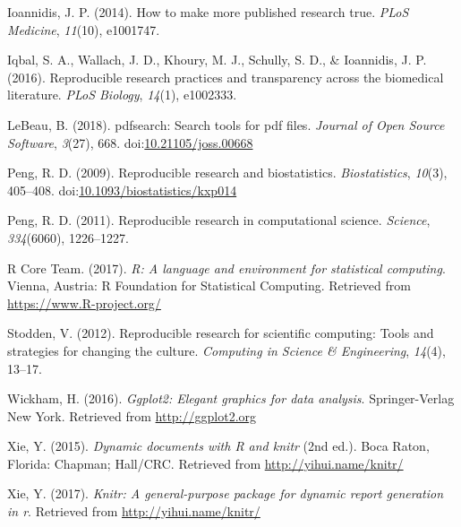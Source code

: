 \documentclass[english,,man]{apa6}
\theoremstyle{definition}
\theoremstyle{definition}
\theoremstyle{definition}
\theoremstyle{remark}
\begin{document}
\leavevmode\hypertarget{ref-ioannidis2014}{}%
Ioannidis, J. P. (2014). How to make more published research true.
\emph{PLoS Medicine}, \emph{11}(10), e1001747.

\leavevmode\hypertarget{ref-iqbal2016}{}%
Iqbal, S. A., Wallach, J. D., Khoury, M. J., Schully, S. D., \&
Ioannidis, J. P. (2016). Reproducible research practices and
transparency across the biomedical literature. \emph{PLoS Biology},
\emph{14}(1), e1002333.

\leavevmode\hypertarget{ref-pdfsearch}{}%
LeBeau, B. (2018). pdfsearch: Search tools for pdf files. \emph{Journal
of Open Source Software}, \emph{3}(27), 668.
doi:\href{https://doi.org/10.21105/joss.00668}{10.21105/joss.00668}

\leavevmode\hypertarget{ref-peng2009}{}%
Peng, R. D. (2009). Reproducible research and biostatistics.
\emph{Biostatistics}, \emph{10}(3), 405--408.
doi:\href{https://doi.org/10.1093/biostatistics/kxp014}{10.1093/biostatistics/kxp014}

\leavevmode\hypertarget{ref-peng2011}{}%
Peng, R. D. (2011). Reproducible research in computational science.
\emph{Science}, \emph{334}(6060), 1226--1227.

\leavevmode\hypertarget{ref-rpro}{}%
R Core Team. (2017). \emph{R: A language and environment for statistical
computing}. Vienna, Austria: R Foundation for Statistical Computing.
Retrieved from \url{https://www.R-project.org/}

\leavevmode\hypertarget{ref-stodden2012}{}%
Stodden, V. (2012). Reproducible research for scientific computing:
Tools and strategies for changing the culture. \emph{Computing in
Science \& Engineering}, \emph{14}(4), 13--17.

\leavevmode\hypertarget{ref-ggplot2}{}%
Wickham, H. (2016). \emph{Ggplot2: Elegant graphics for data analysis}.
Springer-Verlag New York. Retrieved from \url{http://ggplot2.org}

\leavevmode\hypertarget{ref-knitr}{}%
Xie, Y. (2015). \emph{Dynamic documents with R and knitr} (2nd ed.).
Boca Raton, Florida: Chapman; Hall/CRC. Retrieved from
\url{http://yihui.name/knitr/}

\leavevmode\hypertarget{ref-knitrmanual}{}%
Xie, Y. (2017). \emph{Knitr: A general-purpose package for dynamic
report generation in r}. Retrieved from \url{http://yihui.name/knitr/}
\end{document}
